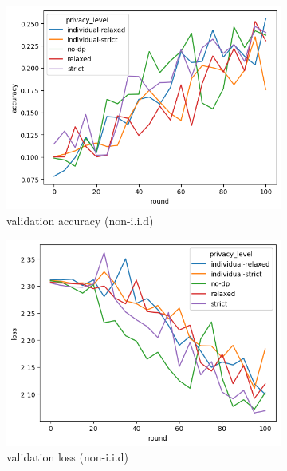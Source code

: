 \begin{figure}
	\centering
	\begin{subfigure}{0.4\textwidth}
		\centering
		\includegraphics[width=\textwidth]{Bilder/cifar10-accuracy.png}
		\caption{validation accuracy (non-i.i.d)}
	\end{subfigure}
	\begin{subfigure}{0.4\textwidth}
		\centering
		\includegraphics[width=\textwidth]{Bilder/cifar10-loss.png}
		\caption{validation loss (non-i.i.d)}
	\end{subfigure}
	\begin{subfigure}{0.4\textwidth}
		\centering

\end{subfigure}
\end{figure}
